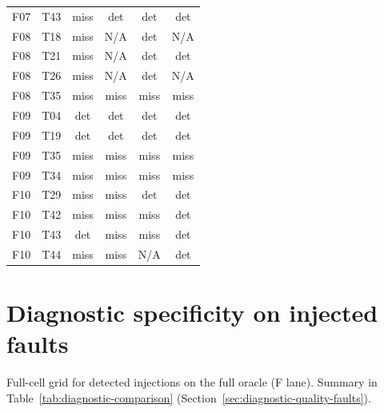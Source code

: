 \begin{longtable}{@{}llcccc@{}}
F07 & T43 & miss & det & det & det \\
F08 & T18 & miss & N/A & det & N/A \\
F08 & T21 & miss & N/A & det & det \\
F08 & T26 & miss & N/A & det & N/A \\
F08 & T35 & miss & miss & miss & miss \\
F09 & T04 & det & det & det & det \\
F09 & T19 & det & det & det & det \\
F09 & T35 & miss & miss & miss & miss \\
F09 & T34 & miss & miss & miss & miss \\
F10 & T29 & miss & miss & det & det \\
F10 & T42 & miss & miss & miss & det \\
F10 & T43 & det & miss & miss & det \\
F10 & T44 & miss & miss & N/A & det \\
\bottomrule
\end{longtable}

\section{Diagnostic specificity on injected faults}
\label{app:diagnostic-grid}

Full-cell grid for detected injections on the full oracle (F lane). Summary in Table~\ref{tab:diagnostic-comparison} (Section~\ref{sec:diagnostic-quality-faults}).


